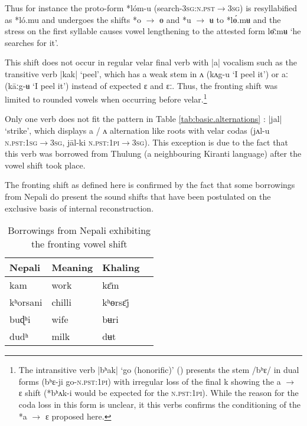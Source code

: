 \documentclass[oldfontcommands,oneside,a4paper,11pt]{article}
\newcommand{\ipa}[1]{{\phon \mbox{#1}}} %
\begin{document}
Thus for instance  the proto-form \ipa{*lóm-u} (search-\textsc{3sg:n.pst$\rightarrow$3sg}) is resyllabified as \ipa{*ló.mu} and undergoes the shifts \ipa{*o} $\rightarrow$ \ipa{ɵ} and \ipa{*u} $\rightarrow$ \ipa{ʉ} to  \ipa{*lɵ́.mʉ} and the stress on the first syllable causes vowel lengthening to the attested form \ipa{lɵ̄ːmʉ} `he searches for it'.

This shift does not occur in regular velar final verb with |a| vocalism such as the transitive verb |kak| `peel', which has a weak stem in \ipa{ʌ} (\ipa{kʌg-u} `I peel it') or \ipa{aː}  (\ipa{kāːg-ʉ} `I peel it') instead of expected \ipa{ɛ} and \ipa{ɛː}.  Thus, the fronting shift was limited to rounded vowels when occurring before velar.\footnote{The intransitive   verb |\ipa{bʰak}| `go (honorific)' (\citealt[1115]{jacques12khaling}) presents the stem  /\ipa{bʰɛ}/ in dual forms (\ipa{bʰɛ-ji} go-\textsc{n.pst:1pi}) with irregular loss of  the final \ipa{k} showing the \ipa{a} $\rightarrow$ \ipa{ɛ} shift (\ipa{*bʰʌk-i} would be expected for the \textsc{n.pst:1pi}). While the reason for the coda loss in this form is unclear, it this verbs confirms the conditioning of the \ipa{*a} $\rightarrow$ \ipa{ɛ} proposed here.}

 Only one verb  does not fit the pattern in Table \ref{tab:basic.alternations} :  |\ipa{jal}|  `strike', which displays \ipa{a} / \ipa{ʌ} alternation like roots with velar codas (\ipa{jʌl-u} \textsc{n.pst:1sg$\rightarrow$3sg}, \ipa{ja‍̄l-ki} \textsc{n.pst:1pi$\rightarrow$3sg}). This exception is due to the fact that this verb was borrowed from Thulung (a neighbouring Kiranti language) after the vowel shift took place.

The fronting shift as defined here is confirmed   by the fact that some borrowings from Nepali do present the sound shifts that have been postulated on the exclusive basis of internal reconstruction.

\begin{table}
\caption{Borrowings from Nepali exhibiting the fronting vowel shift} \label{tab:nep.fronting} \centering
\begin{tabular}{llll}
\toprule
Nepali & Meaning & Khaling \\
\midrule
\ipa{kam} & work & \ipa{kɛ̄m} \\
\ipa{kʰorsani} & chilli&\ipa{kʰɵrsɛ̄j}\\
\ipa{buɖʰi} & wife&\ipa{bʉri}\\
\ipa{dudʰ} & milk&\ipa{dʉt}\\
\bottomrule
\end{tabular}
\end{table}
\end{document}
